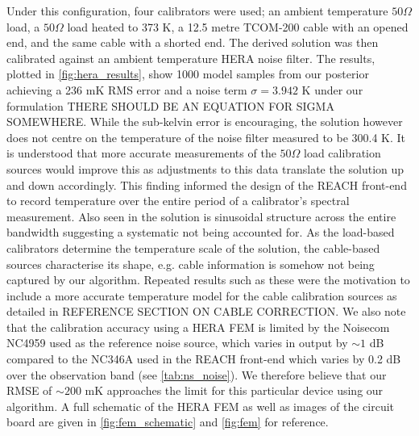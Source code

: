 Under this configuration, four calibrators were used; an ambient temperature $50 \Omega$ load, a $50 \Omega$ load heated to 373 K, a 12.5 metre TCOM-200 cable with an opened end, and the same cable with a shorted end. The derived solution was then calibrated against an ambient temperature HERA noise filter. The results, plotted in \cref{fig:hera_results}, show 1000 model samples from our posterior achieving a 236 mK RMS error and a noise term $\sigma = 3.942$ K under our formulation THERE SHOULD BE AN EQUATION FOR SIGMA SOMEWHERE. While the sub-kelvin error is encouraging, the solution however does not centre on the temperature of the noise filter measured to be 300.4 K. It is understood that more accurate measurements of the $50 \Omega$ load calibration sources would improve this as adjustments to this data translate the solution up and down accordingly. This finding informed the design of the REACH front-end to record temperature over the entire period of a calibrator’s spectral measurement. Also seen in the solution is sinusoidal structure across the entire bandwidth suggesting a systematic not being accounted for. As the load-based calibrators determine the temperature scale of the solution, the cable-based sources characterise its shape, e.g. cable information is somehow not being captured by our algorithm. Repeated results such as these were the motivation to include a more accurate temperature model for the cable calibration sources as detailed in REFERENCE SECTION ON CABLE CORRECTION. We also note that the calibration accuracy using a HERA FEM is limited by the Noisecom NC4959 used as the reference noise source, which varies in output by $\sim1$ dB compared to the NC346A used in the REACH front-end which varies by 0.2 dB over the observation band (see \cref{tab:ns_noise}). We therefore believe that our RMSE of $\sim200$ mK approaches the limit for this particular device using our algorithm. A full schematic of the HERA FEM as well as images of the circuit board are given in \cref{fig:fem_schematic} and \cref{fig:fem} for reference.
